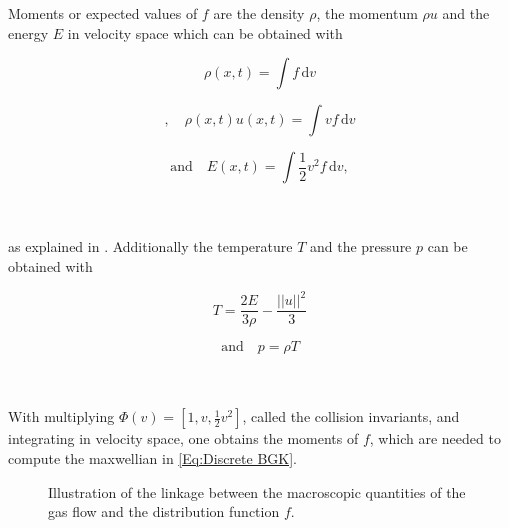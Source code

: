 Moments or expected values of \(f\) are the density \(\rho\), the momentum \(\rho u\) and the energy \(E\) in velocity space which can be obtained with\\
\begin{minipage}{.25\textwidth}
	\begin{equation}
		\rho(x,t) = \int\! f \,\mathrm{d}v\label{Eq:Moments1} 
	\end{equation}
\end{minipage}%
\begin{minipage}{.35\textwidth}
	\begin{equation}
			\mathrm{,}\quad\rho(x,t) u(x,t) = \int\! v f \,\mathrm{d}v\label{Eq:Moments2}
	\end{equation}
\end{minipage}%
\begin{minipage}{.35\textwidth}
	\begin{equation}
	\mathrm{and}\quad E(x,t) = \int\! \frac{1}{2}v^2 f  \,\mathrm{d}v\mathrm{,}\label{Eq:Moments3}
	\end{equation}
\end{minipage}\\\\
as explained in  \cite{puppo2019kinetic}. Additionally the temperature \(T\) and the pressure \(p\) can be obtained with\\
\begin{minipage}{0.45\textwidth}
	\begin{equation}
		T = \frac{2E}{3\rho} - \frac{||u||^2}{3}
	\end{equation}
\end{minipage}%
\begin{minipage}{.45\textwidth}
	\begin{equation}
		\mathrm{and}\quad p = \rho T
	\end{equation}
\end{minipage}\\\\
With multiplying \(\Phi(v) = [1,v,\frac{1}{2} v^2]\), called the collision invariants, and integrating in velocity space, one obtains the moments of \(f\), which are needed to compute the maxwellian in \cref{Eq:Discrete BGK}.\\
\begin{wrapfigure}{r}{0.5\textwidth}
	\vspace{-10pt}
	
	\caption{Illustration of the linkage between the macroscopic quantities of the gas flow and the distribution function \(f\).}
	\vspace{-30pt}
	\label{Fig:Demo Macro}
\end{wrapfigure}
